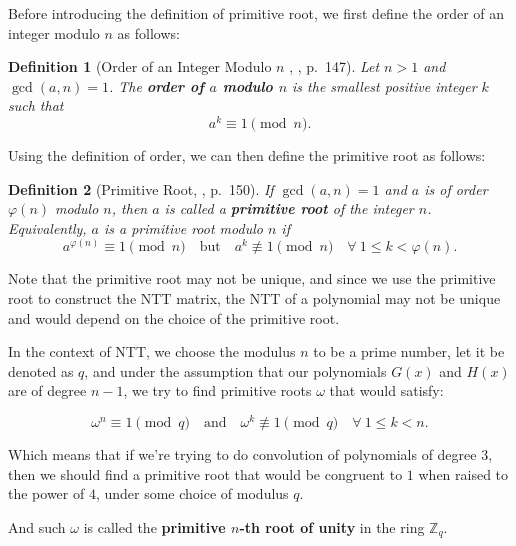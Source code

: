 \documentclass[12pt]{article}
\newtheorem{definition}{Definition}[section]
\begin{document}
Before introducing the definition of primitive root, 
we first define the order of an integer modulo $n$ as follows:

\begin{definition}[Order of an Integer Modulo $n$ , \cite{number_theory}, p.~147]
    Let $n > 1$ and $\gcd(a, n) = 1$. 
    The \textbf{order of $a$ modulo $n$} is the smallest positive integer $k$ such that
    \begin{equation*}
    a^k \equiv 1 \pmod{n}.
    \end{equation*}
\end{definition}

Using the definition of order, we can then define the primitive root as follows:

\begin{definition}[Primitive Root, \cite{number_theory}, p.~150]
    If $\gcd(a, n) = 1$ and $a$ is of order $\varphi(n)$ modulo $n$, 
    then $a$ is called a \textbf{primitive root} of the integer $n$.
    Equivalently, $a$ is a primitive root modulo $n$ if
    \begin{equation*}
    a^{\varphi(n)} \equiv 1 \pmod{n} \quad \text{but} \quad a^k \not\equiv 1 \pmod{n} \quad \forall \ 1 \leq k < \varphi(n).
    \end{equation*}
\end{definition}

Note that the primitive root may not be unique, and since we use the primitive root to construct the NTT matrix, 
the NTT of a polynomial may not be unique and would depend on the choice of the primitive root.
\cite[pp.~5--6]{beginner_guide}
\bigskip

In the context of NTT, we choose the modulus $n$ to be a prime number, let it be denoted as $q$, 
and under the assumption that our polynomials $G(x)$ and $H(x)$ are of degree $n-1$, 
we try to find primitive roots $\omega$ that would satisfy:

\begin{equation*}
    \omega^n \equiv 1 \pmod{q} \quad \text{and} \quad \omega^k \not\equiv 1 \pmod{q} \quad \forall \ 1 \leq k < n.
\end{equation*}

Which means that if we're trying to do convolution of polynomials of degree $3$, 
then we should find a primitive root that would be congruent to $1$ when raised to the power of $4$, 
under some choice of modulus $q$.

And such $\omega$ is called the \textbf{primitive $n$-th root of unity} in the ring $\mathbb{Z}_q$.
\cite[p.~4]{beginner_guide}
\end{document}
